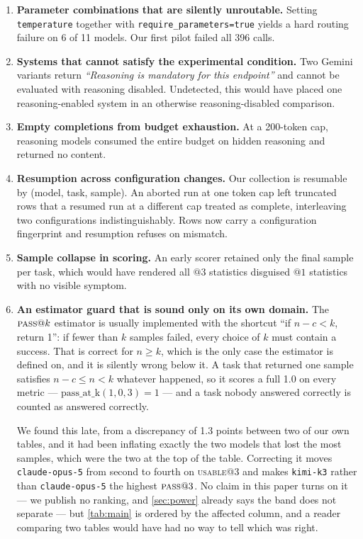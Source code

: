 \documentclass[11pt]{article}
\newcommand{\pass}{\textsc{pass}}
\newcommand{\usable}{\textsc{usable}}
\begin{document}
\begin{enumerate}
\item \textbf{Parameter combinations that are silently unroutable.} Setting
\texttt{temperature} together with \texttt{require\_parameters=true} yields a
hard routing failure on 6 of 11 models. Our first pilot failed all 396 calls.

\item \textbf{Systems that cannot satisfy the experimental condition.} Two
Gemini variants return \emph{``Reasoning is mandatory for this endpoint''}
and cannot be evaluated with reasoning disabled. Undetected, this would have
placed one reasoning-enabled system in an otherwise reasoning-disabled
comparison.

\item \textbf{Empty completions from budget exhaustion.} At a 200-token cap,
reasoning models consumed the entire budget on hidden reasoning and returned
no content.

\item \textbf{Resumption across configuration changes.} Our collection is
resumable by (model, task, sample). An aborted run at one token cap left
truncated rows that a resumed run at a different cap treated as complete,
interleaving two configurations indistinguishably. Rows now carry a
configuration fingerprint and resumption refuses on mismatch.

\item \textbf{Sample collapse in scoring.} An early scorer retained only the
final sample per task, which would have rendered all $@3$ statistics
disguised $@1$ statistics with no visible symptom.

\item \textbf{An estimator guard that is sound only on its own domain.} The
$\pass{}@k$ estimator is usually implemented with the shortcut ``if
$n - c < k$, return 1'': if fewer than $k$ samples failed, every choice of $k$
must contain a success. That is correct for $n \geq k$, which is the only case
the estimator is defined on, and it is silently wrong below it. A task that
returned one sample satisfies $n - c \leq n < k$ whatever happened, so it
scores a full 1.0 on every metric --- $\mathrm{pass\_at\_k}(1, 0, 3) = 1$ ---
and a task nobody answered correctly is counted as answered correctly.

We found this late, from a discrepancy of 1.3 points between two of our own
tables, and it had been inflating exactly the two models that lost the most
samples, which were the two at the top of the table. Correcting it moves
\texttt{claude-opus-5} from second to fourth on \usable{}@3 and makes
\texttt{kimi-k3} rather than \texttt{claude-opus-5} the highest $\pass{}@3$.
No claim in this paper turns on it --- we publish no ranking, and
\cref{sec:power} already says the band does not separate --- but
\cref{tab:main} is ordered by the affected column, and a reader comparing two
tables would have had no way to tell which was right.


\end{enumerate}
\end{document}
